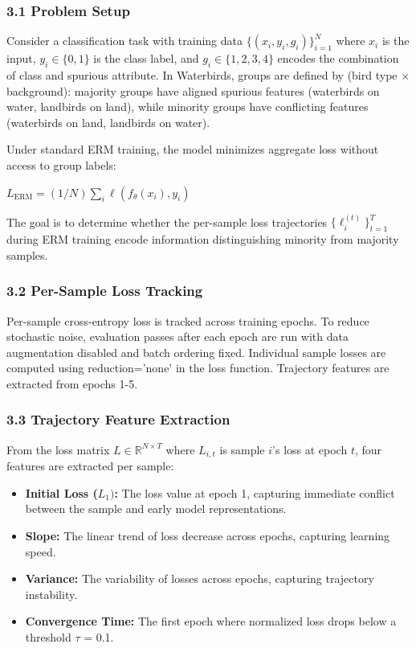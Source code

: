 
\subsubsection{3.1 Problem Setup}

Consider a classification task with training data $\{(x_i, y_i, g_i)\}_{i=1}^{N}$ where $x_i$ is the input, $y_i \in \{0, 1\}$ is the class label, and $g_i \in \{1, 2, 3, 4\}$ encodes the combination of class and spurious attribute. In Waterbirds, groups are defined by (bird type $\times$ background): majority groups have aligned spurious features (waterbirds on water, landbirds on land), while minority groups have conflicting features (waterbirds on land, landbirds on water).

Under standard ERM training, the model minimizes aggregate loss without access to group labels:

$L_{\mathrm{ERM}} = (1/N) \sum_i \ell(f_\theta(x_i), y_i)$

The goal is to determine whether the per-sample loss trajectories $\{\ell_i^{(t)}\}_{t=1}^{T}$ during ERM training encode information distinguishing minority from majority samples.

\subsubsection{3.2 Per-Sample Loss Tracking}

Per-sample cross-entropy loss is tracked across training epochs. To reduce stochastic noise, evaluation passes after each epoch are run with data augmentation disabled and batch ordering fixed. Individual sample losses are computed using reduction='none' in the loss function. Trajectory features are extracted from epochs 1-5.

\subsubsection{3.3 Trajectory Feature Extraction}

From the loss matrix $L \in \mathbb{R}^{N \times T}$ where $L_{i,t}$ is sample $i$'s loss at epoch $t$, four features are extracted per sample:

\begin{itemize}
\item \textbf{Initial Loss ($L_{1})$:} The loss value at epoch 1, capturing immediate conflict between the sample and early model representations.
\item \textbf{Slope:} The linear trend of loss decrease across epochs, capturing learning speed.
\item \textbf{Variance:} The variability of losses across epochs, capturing trajectory instability.
\item \textbf{Convergence Time:} The first epoch where normalized loss drops below a threshold $\tau$ = 0.1.
\end{itemize}


